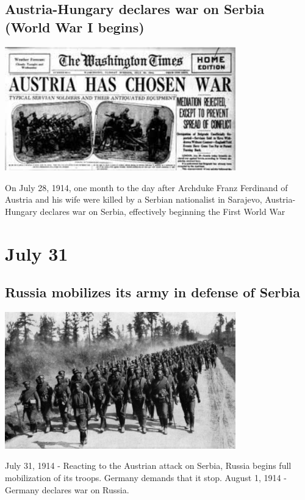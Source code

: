 \documentclass[11pt]{report}
\begin{document}
\subsection{Austria-Hungary declares war on Serbia (World War I begins)}
\vspace{2mm}\begin{center}\includegraphics[width=10cm]{./img/austriaWarSerbia.jpg}\end{center}
On July 28, 1914, one month to the day after Archduke Franz Ferdinand of Austria and his wife were killed by a Serbian nationalist in Sarajevo, Austria-Hungary declares war on Serbia, effectively beginning the First World War

\section{July 31}
\subsection{Russia mobilizes its army in defense of Serbia}
\vspace{2mm}\begin{center}\includegraphics[width=10cm]{./img/russianTroops.jpg}\end{center}
July 31, 1914 - Reacting to the Austrian attack on Serbia, Russia begins full mobilization of its troops. Germany demands that it stop. August 1, 1914 - Germany declares war on Russia.
\end{document}
